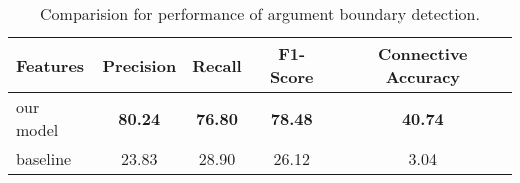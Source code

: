 \begin{table}[ht]
\centering
\begin{tabular}{|l|c|c|c|c|}
\hline

\bf Features        & \bf Precision & \bf Recall & \bf F1-Score & \bf Connective Accuracy \\ \hline
    our model       & \bf 80.24     & \bf 76.80  & \bf 78.48    & \bf 40.74               \\ \hline
    baseline        &     23.83     &     28.90  &     26.12    &      3.04               \\ \hline

\end{tabular}
\caption{\label{t:argument-baseline} Comparision for performance of argument boundary detection. }
\end{table}
